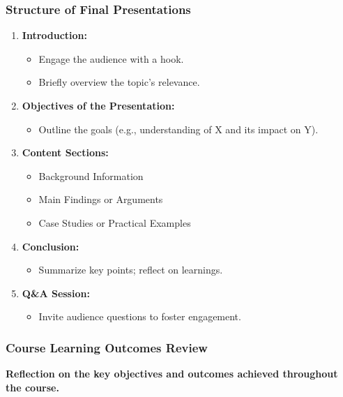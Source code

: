 \documentclass[aspectratio=169]{beamer}
\begin{document}
\begin{frame}[fragile]
    \frametitle{Structure of Final Presentations}
    \begin{enumerate}
        \item \textbf{Introduction:}
        \begin{itemize}
            \item Engage the audience with a hook.
            \item Briefly overview the topic’s relevance.
        \end{itemize}

        \item \textbf{Objectives of the Presentation:}
        \begin{itemize}
            \item Outline the goals (e.g., understanding of X and its impact on Y).
        \end{itemize}

        \item \textbf{Content Sections:}
        \begin{itemize}
            \item Background Information
            \item Main Findings or Arguments
            \item Case Studies or Practical Examples
        \end{itemize}

        \item \textbf{Conclusion:}
        \begin{itemize}
            \item Summarize key points; reflect on learnings.
        \end{itemize}

        \item \textbf{Q\&A Session:}
        \begin{itemize}
            \item Invite audience questions to foster engagement.
        \end{itemize}
    \end{enumerate}
\end{frame}

\begin{frame}[fragile]
    \frametitle{Course Learning Outcomes Review}
    \textbf{Reflection on the key objectives and outcomes achieved throughout the course.}
\end{frame}
\end{document}
